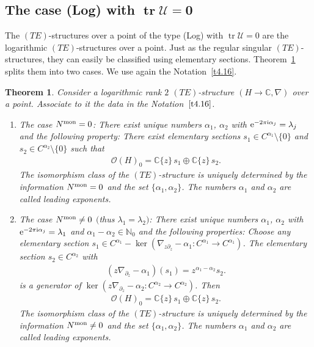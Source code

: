 \documentclass[pdftex]{sigma}%
\numberwithin{equation}{section}
\numberwithin{figure}{section}
\newcommand{\N}{{\mathbb N}}
\newcommand{\C}{{\mathbb C}}
\newcommand{\OO}{{\mathcal O}}
\newcommand{\UU}{{\mathcal U}}
\newcommand{\paa}{\partial}
\newcommand{\nnn}{\nabla}
\DeclareMathOperator{\tr}{tr}
\newtheorem{Theorem}{Theorem}[section]
\begin{document}
\subsection[The case (Log) with $\tr\UU=0$]{The case (Log) with $\boldsymbol{\tr\UU=0}$}\label{c4.6}

The $(TE)$-structures over a point of the type (Log) with
$\tr\UU=0$ are the logarithmic $(TE)$-structures
over a point. Just as the regular singular $(TE)$-structures,
they can easily be classified using
elementary sections. Theorem~\ref{t4.20}
splits them into two cases.
We use again the Notation~\ref{t4.16}.


\begin{Theorem}\label{t4.20}
Consider a logarithmic rank $2$ $(TE)$-structure $(H\to\C,\nnn)$
over a point. Asso\-ci\-ate to it the data in the Notation~$\ref{t4.16}$.
\begin{enumerate}\itemsep=0pt
\item[$(a)$] The case $N^{\rm mon}=0$: There exist unique numbers
$\alpha_1$, $\alpha_2$ with ${\rm e}^{-2\pi {\rm i}\alpha_j}=\lambda_j$
and the following property:
There exist elementary sections $s_1\in C^{\alpha_1}\setminus\{0\}$
and $s_2\in C^{\alpha_2}\setminus\{0\}$ such that
\begin{gather}\label{4.61}
\OO(H)_0 = \C\{z\}\, s_1\oplus \C\{z\}\, s_2.
\end{gather}
The isomorphism class of the $(TE)$-structure is uniquely
determined by the information $N^{\rm mon}=0$ and
the set $\{\alpha_1,\alpha_2\}$.
The numbers $\alpha_1$ and $\alpha_2$ are called
leading exponents.

\item[$(b)$] The case $N^{\rm mon}\neq 0$ $($thus $\lambda_1=\lambda_2)$:
There exist unique numbers $\alpha_1$, $\alpha_2$
with ${\rm e}^{-2\pi {\rm i}\alpha_j}=\lambda_1$ and
$\alpha_1-\alpha_2\in\N_0$ and
the following properties:
Choose any elementary section
$s_1\in C^{\alpha_1}-\ker(\nnn_{z\paa_z}-\alpha_1\colon
C^{\alpha_1}\to C^{\alpha_1})$.
The elementary section $s_2\in C^{\alpha_2}$ with
\begin{gather}\label{4.62}
(z\nnn_{\paa_z}-\alpha_1)(s_1)=z^{\alpha_1-\alpha_2}s_2.
\end{gather}
is a generator of
$\ker(z\nnn_{\paa_z}-\alpha_2\colon C^{\alpha_2}\to C^{\alpha_2})$.
Then
\begin{gather}\label{4.63}
\OO(H)_0=\C\{z\}\, s_1\oplus \C\{z\}\, s_2.
\end{gather}
The isomorphism class of the $(TE)$-structure is
uniquely determined by the information $N^{\rm mon}\neq 0$
and the set $\{\alpha_1,\alpha_2\}$.
The numbers $\alpha_1$ and $\alpha_2$ are called
leading exponents.
\end{enumerate}
\end{Theorem}
\end{document}
